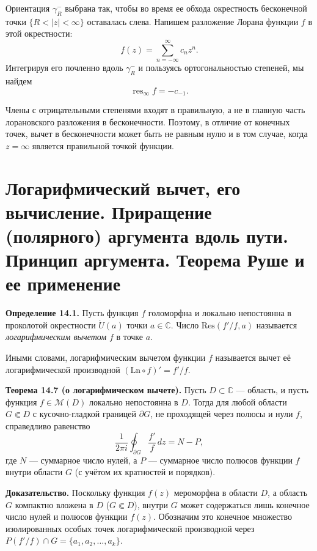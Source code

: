 \documentclass[12pt, a4paper]{article}
\theoremstyle{definition}
\theoremstyle{remark}
\begin{document}
Ориентация $\gamma_R^-$ выбрана так, чтобы во время ее обхода окрестность бесконечной точки $\{R < |z| < \infty\}$ оставалась слева. Напишем разложение Лорана функции $f$ в этой окрестности:
$$f(z) = \sum_{n=-\infty}^{\infty} c_n z^n.$$
Интегрируя его почленно вдоль $\gamma_R^-$ и пользуясь ортогональностью степеней, мы найдем
\begin{equation}
	\mathop{\text{res}}_{\infty} f = -c_{-1}.
\end{equation}

Члены с отрицательными степенями входят в правильную, а не в главную часть лорановского разложения в бесконечности. Поэтому, в отличие от конечных точек, вычет в бесконечности может быть не равным нулю и в том случае, когда $z = \infty$ является правильной точкой функции.

\newpage
\section{Логарифмический вычет, его вычисление. Приращение (полярного) аргумента вдоль пути. Принцип аргумента. Теорема Руше и ее применение}
\textbf{Определение 14.1.} Пусть функция $f$ голоморфна и локально непостоянна в проколотой окрестности $\mathring{U}(a)$ точки $a \in \mathbb{C}$. Число $\text{Res}(f'/f, a)$ называется \textit{логарифмическим вычетом} $f$ в точке $a$.

Иными словами, логарифмическим вычетом функции $f$ называется вычет её логарифмической производной $(\text{Ln} \circ f)' = f'/f$.

\textbf{Теорема 14.7 (о логарифмическом вычете).} Пусть $D \subset \mathbb{C}$ --- область, и пусть функция $f \in \mathcal{M}(D)$ локально непостоянна в $D$. Тогда для любой области $G \Subset D$ с кусочно-гладкой границей $\partial G$, не проходящей через полюсы и нули $f$, справедливо равенство
\begin{equation}
	\frac{1}{2\pi i} \oint_{\partial G} \frac{f'}{f} \, dz = N - P,
\end{equation}
где $N$ --- суммарное число нулей, а $P$ --- суммарное число полюсов функции $f$ внутри области $G$ (с учётом их кратностей и порядков).

\textbf{Доказательство.} Поскольку функция $f(z)$ мероморфна в области $D$, а область $G$ компактно вложена в $D$ ($G \Subset D$), внутри $G$ может содержаться лишь конечное число нулей и полюсов функции $f(z)$. Обозначим это конечное множество изолированных особых точек логарифмической производной через $P(f'/f) \cap G = \{a_1, a_2, \ldots, a_k\}$.
\end{document}
